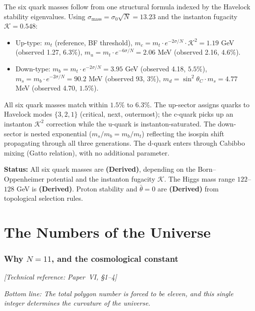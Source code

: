 The six quark masses follow from one structural formula indexed
by the Havelock stability eigenvalues. Using
$\sigma_{\text{mass}} = \sigma_0\sqrt{N} = 13.23$ and the
instanton fugacity $\mathcal{K} = 0.548$:

\begin{itemize}
\item Up-type: $m_t$ (reference, BF threshold),
  $m_c = m_t \cdot e^{-2\sigma/N} \cdot \mathcal{K}^2 = 1.19$ GeV
  (observed 1.27, $6.3\%$),
  $m_u = m_t \cdot e^{-6\sigma/N} = 2.06$ MeV
  (observed 2.16, $4.6\%$).
\item Down-type: $m_b = m_t \cdot e^{-2\sigma/N} = 3.95$ GeV
  (observed 4.18, $5.5\%$),
  $m_s = m_b \cdot e^{-2\sigma/N} = 90.2$ MeV
  (observed 93, $3\%$),
  $m_d = \sin^2\theta_C \cdot m_s = 4.77$ MeV
  (observed 4.70, $1.5\%$).
\end{itemize}

All six quark masses match within $1.5\%$ to $6.3\%$.
The up-sector assigns quarks to Havelock modes
$\{3, 2, 1\}$ (critical, next, outermost); the c-quark
picks up an instanton $\mathcal{K}^2$ correction while
the u-quark is instanton-saturated.
The down-sector is nested exponential
($m_s/m_b = m_b/m_t$) reflecting the isospin shift
propagating through all three generations.
The d-quark enters through Cabibbo mixing
(Gatto relation), with no additional parameter.

\textbf{Status:} All six quark masses are \textbf{(Derived)},
depending on the Born--Oppenheimer potential and the instanton
fugacity $\mathcal{K}$. The Higgs mass range $122$--$128$ GeV
is \textbf{(Derived)}. Proton stability and $\bar\theta = 0$
are \textbf{(Derived)} from topological selection rules.


\part{The Numbers of the Universe}


\section{Why $N = 11$, and the cosmological constant}
\noindent\textit{[Technical reference: Paper~VI, \S1--4]}

\medskip

\noindent\textit{Bottom line: The total polygon number is forced to be
eleven, and this single integer determines the curvature of the
universe.}

\medskip

